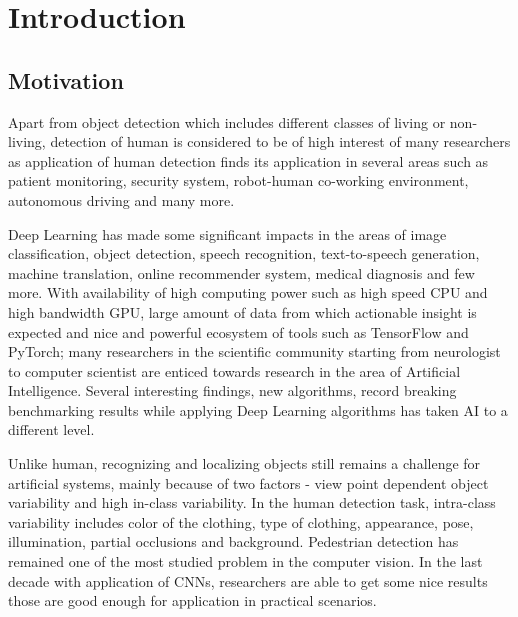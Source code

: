 \pagestyle{fancy}
\fancyhf{}
\fancyhead[EL]{\leftmark} %
\fancyhead[OL]{\leftmark}
\fancyhead[ER,OR]{\thepage}

\setcounter{page}{1}

\chapter{Introduction}
\section{Motivation}
Apart from object detection which includes different classes of living or non-living, detection of human is considered to be of high  interest of many researchers as application of human detection finds its application in several areas such as patient monitoring, security system, robot-human co-working environment, autonomous driving and many more.

\vspace{1em}
\noindent Deep Learning has made some significant impacts in the areas of image classification, 
object detection, speech recognition, text-to-speech generation, machine translation,
online recommender system, medical diagnosis and few more. With availability of high 
computing power such as high speed CPU and high bandwidth GPU, large amount of 
data from which actionable insight is expected and nice and powerful ecosystem of  
tools such as TensorFlow and PyTorch; many researchers in the scientific community 
starting from neurologist to computer scientist are enticed towards research in the area 
of Artificial Intelligence. Several interesting findings, new algorithms, record 
breaking benchmarking results while applying Deep Learning algorithms has taken 
AI to a different level.

\vspace{1em}
\noindent Unlike human, recognizing and localizing objects still remains a challenge for artificial 
systems, mainly because of two factors - view point dependent object variability and
high in-class variability. In the human detection task, intra-class variability includes
color of the clothing, type of clothing, appearance, pose, illumination, partial occlusions
and background. Pedestrian detection has remained one of  the most studied problem in the computer vision.
In the last decade with application of CNNs, researchers are able to get some nice results 
those are good enough for application in practical scenarios.

